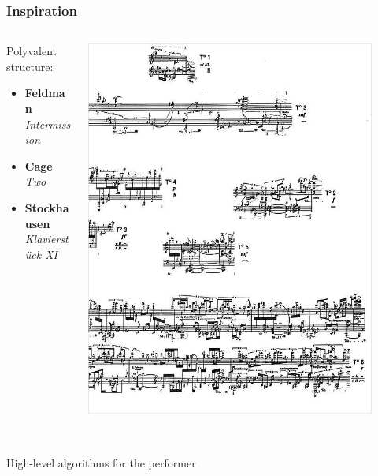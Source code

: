 \documentclass{beamer}
\begin{document}
\begin{frame}
    \frametitle{Inspiration}
    \Large
    \begin{columns}
        \begin{column}{0.45\textwidth}
            Polyvalent structure:
            \begin{itemize}
                \item \textbf{Feldman}~\\\textit{Intermission}
                \item \textbf{Cage}~\\\textit{Two}
                \item \textbf{Stockhausen}~\\\textit{Klavierstück XI}
            \end{itemize}
        \end{column}
        \begin{column}{0.45\textwidth}
            \includegraphics[width=0.9\textwidth]{images/klavierstuck.jpg}
        \end{column}
    \end{columns}~\\
    \vspace{5mm}
    \centering High-level algorithms for the performer
\end{frame}
\end{document}
